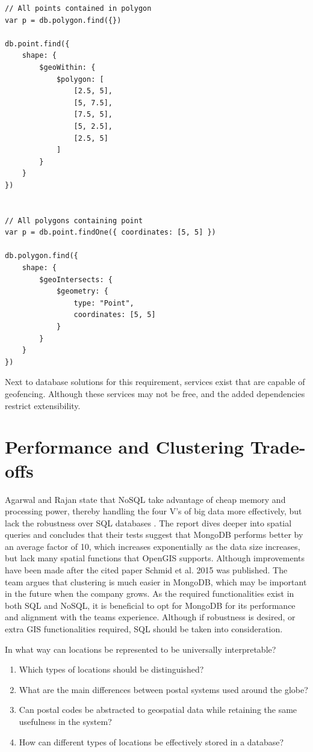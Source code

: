 \begin{Verbatim}[fontsize=\scriptsize]
// All points contained in polygon
var p = db.polygon.find({})

db.point.find({
    shape: {
        $geoWithin: {
            $polygon: [
                [2.5, 5],
                [5, 7.5],
                [7.5, 5],
                [5, 2.5],
                [2.5, 5]
            ]
        }
    }
})


// All polygons containing point
var p = db.point.findOne({ coordinates: [5, 5] })

db.polygon.find({
    shape: {
        $geoIntersects: {
            $geometry: {
                type: "Point",
                coordinates: [5, 5]
            }
        }
    }
})
\end{Verbatim}

Next to database solutions for this requirement, services exist that are capable of geofencing. Although these services may not be free, and the added dependencies restrict extensibility.

\section{Performance and Clustering Trade-offs}

Agarwal and Rajan state that NoSQL take advantage of cheap memory and processing power, thereby handling the four V’s of big data more effectively,
but lack the robustness over SQL databases . The report dives deeper into spatial queries and concludes that their tests suggest that MongoDB performs better by an average factor of 10, which increases exponentially as the data size increases, but lack many spatial functions that OpenGIS supports. Although improvements have been made  after the cited paper Schmid et al. 2015  was published. The team argues that clustering is much easier in MongoDB, which may be important in the future when the company grows. As the required functionalities exist in both SQL and NoSQL, it is beneficial to opt for MongoDB for its performance and alignment with the teams experience. Although if robustness is desired, or extra GIS functionalities required, SQL should be taken into consideration.


In what way can locations be represented to be universally interpretable?
\begin{enumerate}
  \item Which types of locations should be distinguished?
  \item What are the main differences between postal systems used around the globe?
  \item Can postal codes be abstracted to geospatial data while retaining the same usefulness in the system?
  \item How can different types of locations be effectively stored in a database?
\end{enumerate}
